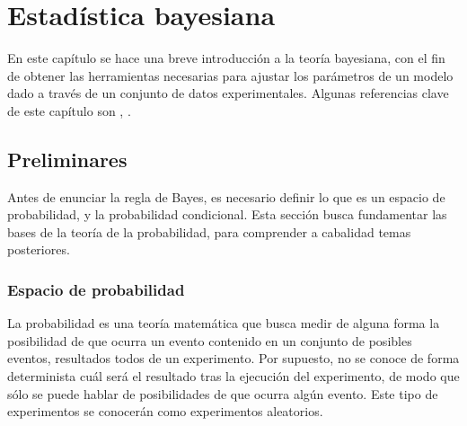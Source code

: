 \chapter{Estadística bayesiana}
En este capítulo se hace una breve introducción a la teoría bayesiana, con el fin de obtener las herramientas necesarias para ajustar los parámetros de un modelo dado a través de un conjunto de datos experimentales. Algunas referencias clave de este capítulo son \cite{Arunachalam}, \cite{rossi_2018}.
\section{Preliminares}
Antes de enunciar la regla de Bayes, es necesario definir lo que es un espacio de probabilidad, y la probabilidad condicional. Esta sección busca fundamentar las bases de la teoría de la probabilidad, para comprender a cabalidad temas posteriores.
\subsection{Espacio de probabilidad}
La probabilidad es una teoría matemática que busca medir de alguna forma la posibilidad de que ocurra un evento contenido en un conjunto de posibles eventos, resultados todos de un experimento. Por supuesto, no se conoce de forma determinista cuál será el resultado tras la ejecución del experimento, de modo que sólo se puede hablar de posibilidades de que ocurra algún evento. Este tipo de experimentos se conocerán como experimentos aleatorios.

